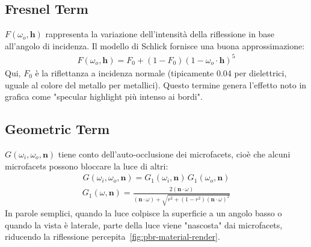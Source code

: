 \documentclass[12pt,a4paper,openright,twoside]{book}
\begin{document}
\subsection*{Fresnel Term}
$F(\omega_o,\mathbf{h})$ rappresenta la variazione dell'intensità della riflessione in base all'angolo di incidenza.
Il modello di Schlick fornisce una buona approssimazione:
\begin{align*}
F(\omega_o,\mathbf{h}) = F_0 + (1 - F_0)(1 - \omega_o\cdot\mathbf{h})^5
\end{align*}
\noindent
Qui, $F_0$ è la riflettanza a incidenza normale (tipicamente 0.04 per dielettrici, uguale al colore del
metallo per metallici).
Questo termine genera l'effetto noto in grafica come "specular highlight più intenso ai bordi".

\subsection*{Geometric Term}
$G(\omega_i,\omega_o,\mathbf{n})$ tiene conto dell'auto-occlusione dei microfacets, cioè che alcuni microfacets
possono bloccare la luce di altri:
\begin{align*}
G(\omega_i,\omega_o,\mathbf{n}) = G_1(\omega_i,\mathbf{n}) \, G_1(\omega_o,\mathbf{n})
\end{align*}
\begin{align*}
G_1(\omega,\mathbf{n}) =
\frac{2(\mathbf{n}\cdot\omega)}
{(\mathbf{n}\cdot\omega) + \sqrt{r^2 + (1-r^2)(\mathbf{n}\cdot\omega)^2}}
\end{align*}
In parole semplici, quando la luce colpisce la superficie a un angolo basso o quando la vista è laterale, parte
della luce viene "nascosta" dai microfacets, riducendo la riflessione percepita~\ref{fig:pbr-material-render}.
\end{document}
